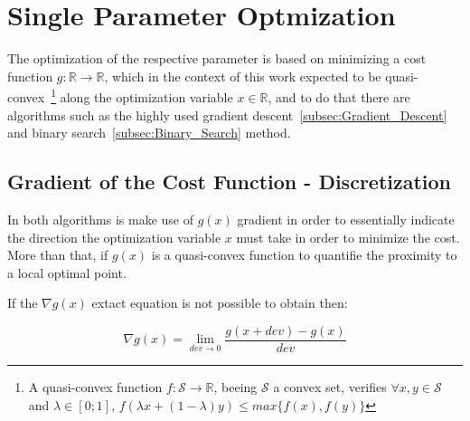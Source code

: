 \newpage %




\section{Single Parameter Optmization}
\label{sec:Single_Parameter_Optmization}


The optimization of the respective parameter is based on minimizing a cost function \(g:\mathbb{R} \to \mathbb{R}\), which in the context of this work expected to be quasi-convex~\footnote{ A quasi-convex function \(f:\mathcal{S} \to \mathbb{R}\), beeing \(\mathcal{S}\) a convex set, verifies \(\forall x,y \in \mathcal{S}\) and \(\lambda \in [0;1]\), \(f(\lambda x + (1-\lambda)y) \leq max\{f(x), f(y)\}\)   } along the optimization variable \(x \in \mathbb{R}\), and to do that there are algorithms such as the highly used gradient descent~\ref{subsec:Gradient_Descent}  and binary search~\ref{subsec:Binary_Search} method.



\subsection{Gradient of the Cost Function - Discretization}
\label{subsec:Gradient_Cost_Function_Discretization}

In both algorithms is make use of \(g(x)\) gradient in order to essentially indicate the direction the optimization variable \(x\) must take in order to minimize the cost. More than that, if \(g(x)\) is a quasi-convex function to quantifie the proximity to a local optimal point. \par
If the \(\nabla g(x)\) extact equation is not possible to obtain then:

\begin{equation}
    \nabla g(x) = \lim_{dev \to 0} \frac{g(x + dev) - g(x)}{dev}
    \label{eq:Gradient_formula}
\end{equation}

